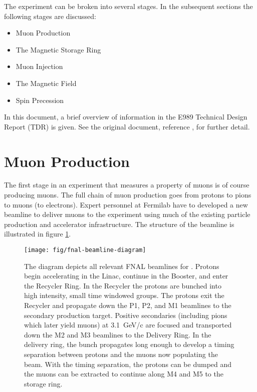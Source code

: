 The \mugmtwo experiment can be broken into several stages.  In the subsequent sections the following stages are discussed:

\begin{itemize}[noitemsep]
\item{Muon Production}
\item{The Magnetic Storage Ring}
\item{Muon Injection}
\item{The Magnetic Field}
\item{Spin Precession}
\end{itemize}

\noindent
In this document, a brief overview of information in the E989 Technical Design Report (TDR) is given. See the original document, reference \cite{e989-tdr}, for further detail. 

\section{Muon Production} \label{sec:muon-production}

The first stage in an experiment that measures a property of muons is of course producing muons. The full chain of muon production goes from protons to pions to muons (to electrons).  Expert personnel at Fermilab have to developed a new beamline to deliver muons to the \gmtwo experiment using much of the existing particle production and accelerator infrastructure.  The structure of the beamline is illustrated in figure \ref{fig:fnal-beamline-diagram}.


\begin{figure}
\texttt{[image: fig/fnal-beamline-diagram]}
\caption{
    The diagram depicts all relevant FNAL beamlines for \gmtwo.  Protons begin accelerating in the Linac, continue in the Booster, and enter the Recycler Ring. In the Recycler the protons are bunched into high intensity, small time windowed groups.  The protons exit the Recycler and propagate down the P1, P2, and M1 beamlines to the secondary production target.  Positive secondaries (including pions which later yield muons) at \SI{3.1}{\GeV/c} are focused and transported down the M2 and M3 beamlines to the Delivery Ring.  In the delivery ring, the bunch propagates long enough to develop a timing separation between protons and the muons now populating the beam.  With the timing separation, the protons can be dumped and the muons can be extracted to continue along M4 and M5 to the \gmtwo storage ring. 
    \label{fig:fnal-beamline-diagram}
}
\end{figure}


